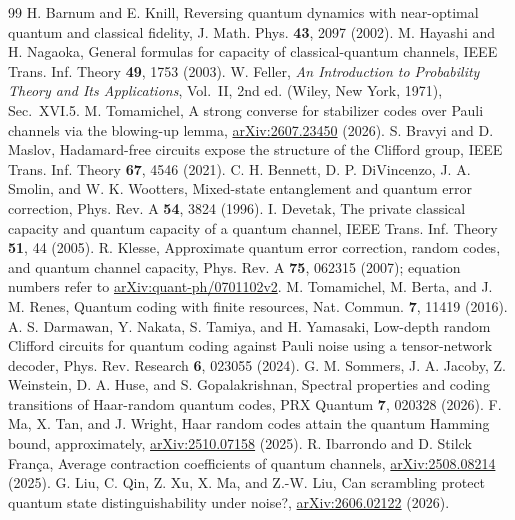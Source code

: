 \documentclass[aps,prl,onecolumn,superscriptaddress,amsmath,amssymb]{revtex4-2}
\begin{document}
\begin{thebibliography}{99}
 H. Barnum and E. Knill, Reversing quantum dynamics with near-optimal quantum and classical fidelity, J. Math. Phys. \textbf{43}, 2097 (2002).
 M. Hayashi and H. Nagaoka, General formulas for capacity of classical-quantum channels, IEEE Trans. Inf. Theory \textbf{49}, 1753 (2003).
 W. Feller, \emph{An Introduction to Probability Theory and Its Applications}, Vol.~II, 2nd ed. (Wiley, New York, 1971), Sec.~XVI.5.
 M. Tomamichel, A strong converse for stabilizer codes over Pauli channels via the blowing-up lemma, \href{https://arxiv.org/abs/2607.23450}{arXiv:2607.23450} (2026).
 S. Bravyi and D. Maslov, Hadamard-free circuits expose the structure of the Clifford group, IEEE Trans. Inf. Theory \textbf{67}, 4546 (2021).
 C. H. Bennett, D. P. DiVincenzo, J. A. Smolin, and W. K. Wootters, Mixed-state entanglement and quantum error correction, Phys. Rev. A \textbf{54}, 3824 (1996).
 I. Devetak, The private classical capacity and quantum capacity of a quantum channel, IEEE Trans. Inf. Theory \textbf{51}, 44 (2005).
 R. Klesse, Approximate quantum error correction, random codes, and quantum channel capacity, Phys. Rev. A \textbf{75}, 062315 (2007); equation numbers refer to \href{https://arxiv.org/abs/quant-ph/0701102v2}{arXiv:quant-ph/0701102v2}.
 M. Tomamichel, M. Berta, and J. M. Renes, Quantum coding with finite resources, Nat. Commun. \textbf{7}, 11419 (2016).
 A. S. Darmawan, Y. Nakata, S. Tamiya, and H. Yamasaki, Low-depth random Clifford circuits for quantum coding against Pauli noise using a tensor-network decoder, Phys. Rev. Research \textbf{6}, 023055 (2024).
 G. M. Sommers, J. A. Jacoby, Z. Weinstein, D. A. Huse, and S. Gopalakrishnan, Spectral properties and coding transitions of Haar-random quantum codes, PRX Quantum \textbf{7}, 020328 (2026).
 F. Ma, X. Tan, and J. Wright, Haar random codes attain the quantum Hamming bound, approximately, \href{https://arxiv.org/abs/2510.07158}{arXiv:2510.07158} (2025).
 R. Ibarrondo and D. Stilck Fran\c{c}a, Average contraction coefficients of quantum channels, \href{https://arxiv.org/abs/2508.08214}{arXiv:2508.08214} (2025).
 G. Liu, C. Qin, Z. Xu, X. Ma, and Z.-W. Liu, Can scrambling protect quantum state distinguishability under noise?, \href{https://arxiv.org/abs/2606.02122}{arXiv:2606.02122} (2026).
\end{thebibliography}
\end{document}
